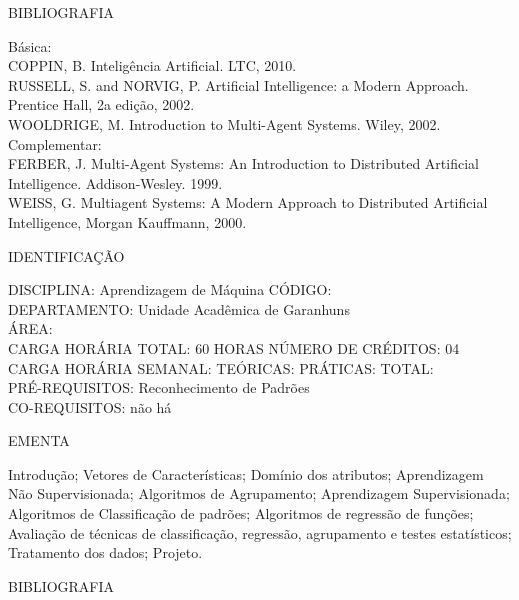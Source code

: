 \documentclass[
	12pt,				%
	openright,			%
  oneside,     %
	a4paper,			%
	english,			%
	french,				%
	spanish,			%
	brazil				%
	]{abntex2}
\begin{document}
\begin{apendicesenv}
BIBLIOGRAFIA 

Básica:\\
COPPIN, B. Inteligência Artificial. LTC, 2010.\\
RUSSELL, S. and NORVIG, P. Artificial Intelligence: a Modern Approach.
Prentice Hall, 2a edição, 2002.\\
WOOLDRIGE, M. Introduction to Multi-Agent Systems. Wiley, 2002.\\
Complementar:\\
FERBER, J. Multi-Agent Systems: An Introduction to Distributed
Artificial Intelligence. Addison-Wesley. 1999.\\
WEISS, G. Multiagent Systems: A Modern Approach to Distributed
Artificial Intelligence, Morgan Kauffmann, 2000.

\newpage IDENTIFICAÇÃO

DISCIPLINA: Aprendizagem de Máquina CÓDIGO:\\ 
DEPARTAMENTO: Unidade Acadêmica de Garanhuns\\
ÁREA: \\
CARGA HORÁRIA TOTAL: 60 HORAS NÚMERO DE CRÉDITOS: 04\\
CARGA HORÁRIA SEMANAL: TEÓRICAS: PRÁTICAS: TOTAL: \\
PRÉ-REQUISITOS: Reconhecimento de Padrões\\
CO-REQUISITOS: não há

EMENTA 

Introdução; Vetores de Características; Domínio dos atributos;
Aprendizagem Não Supervisionada; Algoritmos de Agrupamento;
Aprendizagem Supervisionada; Algoritmos de Classificação de padrões;
Algoritmos de regressão de funções; Avaliação de técnicas de
classificação, regressão, agrupamento e testes estatísticos; Tratamento
dos dados; Projeto.

BIBLIOGRAFIA 


\end{apendicesenv}
\end{document}
